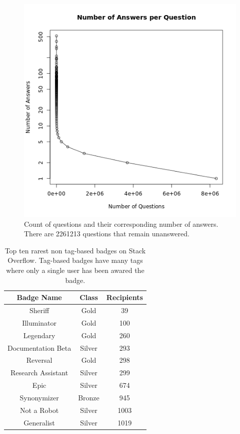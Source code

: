 \documentclass[a4paper,11pt, notitlepage]{report}
\theoremstyle{definition}
\numberwithin{equation}{section}		%
\begin{document}
\begin{figure}[ht]
    \centering
    \includegraphics[width=6in]{figures/num_ans_per_question.png}
    \caption{Count of questions and their corresponding number of answers. There are 2261213 questions that remain unanswered.}
    \label{fig:questions-to-num-answers}
\end{figure}

\begin{table}[ht]
    \centering
    \begin{tabular}{c|cc}
    \hline
    \textbf{Badge Name} & \textbf{Class} & \textbf{Recipients} \\ \hline
    Sheriff & Gold & 39 \\
    Illuminator & Gold & 100 \\
    Legendary & Gold & 260 \\
    Documentation Beta & Silver & 293 \\
    Reversal & Gold & 298 \\
    Research Assistant & Silver & 299 \\
    Epic & Silver & 674 \\
    Synonymizer & Bronze & 945 \\
    Not a Robot & Silver & 1003 \\
    Generalist & Silver & 1019 \\
    \end{tabular}
    \caption{Top ten rarest non tag-based badges on Stack Overflow. Tag-based badges have many tags where only a single user has been awared the badge.}
    \label{tab:rarest-badges}
\end{table}
\end{document}
